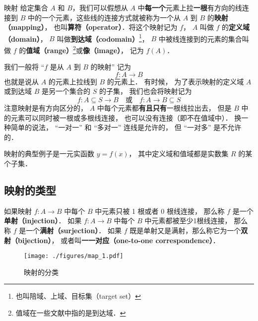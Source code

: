 

\begin{definition}{映射}
给定集合 $A$ 和 $B$，我们可以假想从 $A$ 中\textbf{每一个}元素上拉\textbf{一根}有方向的线连接到 $B$ 中的一个元素，这些线的连接方式就被称为一个从 $A$ 到 $B$ 的\textbf{映射（mapping）}， 也叫\textbf{算符（operator）}．将这个映射记为 $f$， $A$ 叫做 $f$ 的\textbf{定义域（domain）}， $B$ 叫做\textbf{到达域（codomain）}\footnote{也叫陪域、上域、目标集（target set）}， $B$ 中被线连接到的元素的集合叫做 $f$ 的\textbf{值域（range）}\footnote{值域在一些文献中指的是到达域．}或\textbf{像（image）}， 记为 $f(A)$．
\end{definition}

我们一般将 “$f$ 是从 $A$ 到 $B$ 的映射” 记为
\begin{equation}
f:A\to B
\end{equation}
也就是说从 $A$ 的元素上拉线到 $B$ 的元素上． 有时候， 为了表示映射的定义域 $A$ 或到达域 $B$ 是另一个集合的 $S$ 的子集， 我们也会将映射记为
\begin{equation}
f: A\subseteq S \to B \quad\text{或}\quad f: A \to B \subseteq S
\end{equation}
注意映射是有方向区分的， $A$ 中每个元素都\textbf{有且只有}一根线拉出去， 但是 $B$ 中的元素可以同时被一根或多根线连接， 也可以没有连接（即不在值域中）． 换一种简单的说法， “一对一” 和 “多对一” 连线是允许的， 但 “一对多” 是不允许的．

\begin{example}{}
映射的典型例子是一元实函数 $y = f(x)$， 其中定义域和值域都是实数集 $R$ 的某个子集．
\end{example}

\subsection{映射的类型}
\begin{definition}{}\label{map_def1}
如果映射 $f:A \to B$ 中每个 $B$ 中元素只被 1 根或者 0 根线连接， 那么称 $f$ 是一个\textbf{单射（injection）}． 如果 $f:A\to B$ 中每个 $B$ 中元素都被至少1根线连接， 那么称 $f$ 是一个\textbf{满射（surjection）}． 如果 $f$ 既是单射又是满射，那么称它为一个\textbf{双射（bijection）}， 或者叫\textbf{一一对应（one-to-one correspondence）}．
\end{definition}

\begin{figure}[ht]
\centering
\texttt{[image: ./figures/map\_1.pdf]}
\caption{映射的分类} \label{map_fig1}
\end{figure}

